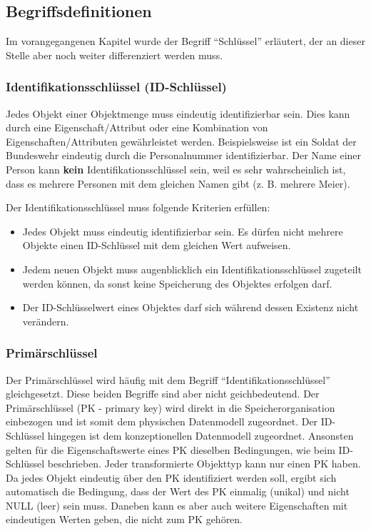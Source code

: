      \subsection{Begriffsdefinitionen}
        \label{basics_definitions}
        Im vorangegangenen Kapitel wurde der Begriff \enquote{Schlüssel} erläutert, der an dieser Stelle aber noch weiter differenziert werden muss.
        \subsubsection{Identifikationsschlüssel (ID-Schlüssel)}
          Jedes Objekt einer Objektmenge muss eindeutig identifizierbar sein. Dies kann durch eine Eigenschaft/Attribut oder eine Kombination von Eigenschaften/Attributen gewährleistet werden. Beispielsweise ist ein Soldat der Bundeswehr eindeutig durch die Personalnummer identifizierbar. Der Name einer Person kann \textbf{kein} Identifikationsschlüssel sein, weil es sehr wahrscheinlich ist, dass es mehrere Personen mit dem gleichen Namen gibt (z. B. mehrere Meier).

          Der Identifikationsschlüssel muss folgende Kriterien erfüllen:
          \begin{itemize}
           \item Jedes Objekt muss eindeutig identifizierbar sein. Es dürfen nicht mehrere Objekte einen ID-Schlüssel mit dem gleichen Wert aufweisen.
           \item Jedem neuen Objekt muss augenblicklich ein Identifikationsschlüssel zugeteilt werden können, da sonst keine Speicherung des Objektes erfolgen darf.
           \item Der ID-Schlüsselwert eines Objektes darf sich während dessen Existenz nicht verän\-dern.
          \end{itemize}
        \subsubsection{Primärschlüssel}
          Der Primärschlüssel wird häufig mit dem Begriff \enquote{Identifikationsschlüssel} gleichgesetzt. Diese beiden Begriffe sind aber nicht geichbedeutend. Der Primärschlüssel (PK - primary key) wird direkt in die Speicherorganisation einbezogen und ist somit dem physischen Datenmodell zugeordnet. Der ID-Schlüssel hingegen ist dem konzeptionellen Datenmodell zugeordnet. Ansonsten gelten für die Eigenschaftswerte eines PK dieselben Bedingungen, wie beim ID-Schlüssel beschrieben. Jeder transformierte Objekttyp kann nur einen PK haben. Da jedes Objekt eindeutig über den PK identifiziert werden soll, ergibt sich automatisch die Bedingung, dass der Wert des PK einmalig (unikal) und nicht NULL (leer) sein muss. Daneben kann es aber auch weitere Eigenschaften mit eindeutigen Werten geben, die nicht zum PK gehören.
\clearpage
